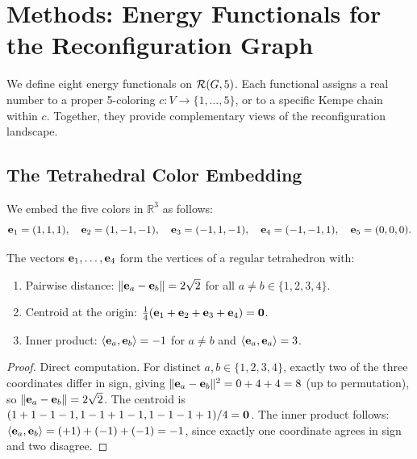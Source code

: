 
\section{Methods: Energy Functionals for the Reconfiguration Graph}
\label{sec:methods}

We define eight energy functionals on $\mathcal{R}(G, 5)$. Each functional
assigns a real number to a proper 5-coloring $c \colon V \to \{1,
\ldots, 5\}$, or to a specific Kempe chain within $c$. Together, they
provide complementary views of the reconfiguration landscape.

\subsection{The Tetrahedral Color Embedding}\label{sec:tet-embed}

We embed the five colors in $\mathbb{R}^3$ as follows:
\begin{equation}\label{eq:tet-embed}
  \mathbf{e}_{1} = (1,1,1), \quad
  \mathbf{e}_{2} = (1,-1,-1), \quad
  \mathbf{e}_{3} = (-1,1,-1), \quad
  \mathbf{e}_{4} = (-1,-1,1), \quad
  \mathbf{e}_{5} = (0,0,0).
\end{equation}

\begin{proposition}\label{prop:tet-geom}
The vectors $\mathbf{e}_{1}, \ldots, \mathbf{e}_{4}$ form the vertices of a regular
tetrahedron with:
\begin{enumerate}[label=(\alph*)]
  \item Pairwise distance: $\lVert \mathbf{e}_{a} - \mathbf{e}_{b} \rVert = 2\sqrt{2}$ for
    all $a \neq b \in \{1,2,3,4\}$.
  \item Centroid at the origin:
    $\frac{1}{4}(\mathbf{e}_{1} + \mathbf{e}_{2} + \mathbf{e}_{3} + \mathbf{e}_{4}) = \mathbf{0}$.
  \item Inner product: $\langle \mathbf{e}_{a}, \mathbf{e}_{b} \rangle = -1$ for $a \neq b$ and
    $\langle \mathbf{e}_{a}, \mathbf{e}_{a} \rangle = 3$.
\end{enumerate}
\end{proposition}

\begin{proof}
Direct computation. For distinct $a, b \in \{1,2,3,4\}$, exactly two of
the three coordinates differ in sign, giving
$\lVert \mathbf{e}_{a} - \mathbf{e}_{b} \rVert^2 = 0 + 4 + 4 = 8$ (up to permutation), so
$\lVert \mathbf{e}_{a} - \mathbf{e}_{b} \rVert = 2\sqrt{2}$. The centroid is
$(1+1-1-1, 1-1+1-1, 1-1-1+1)/4 = \mathbf{0}$. The inner product follows:
$\langle \mathbf{e}_{a}, \mathbf{e}_{b} \rangle = (+1) + (-1) + (-1) = -1$, since exactly
one coordinate agrees in sign and two disagree.
\end{proof}

